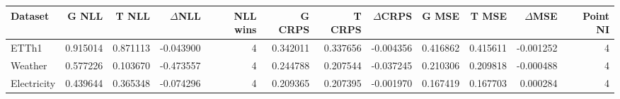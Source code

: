 \begin{tabular}{@{}lrrrrrrrrrrr@{}}
\toprule
Dataset & G NLL & T NLL & $\Delta$NLL & NLL wins & G CRPS & T CRPS & $\Delta$CRPS & G MSE & T MSE & $\Delta$MSE & Point NI \\
\midrule
ETTh1 & 0.915014 & 0.871113 & -0.043900 & 4 & 0.342011 & 0.337656 & -0.004356 & 0.416862 & 0.415611 & -0.001252 & 4 \\
Weather & 0.577226 & 0.103670 & -0.473557 & 4 & 0.244788 & 0.207544 & -0.037245 & 0.210306 & 0.209818 & -0.000488 & 4 \\
Electricity & 0.439644 & 0.365348 & -0.074296 & 4 & 0.209365 & 0.207395 & -0.001970 & 0.167419 & 0.167703 & 0.000284 & 4 \\
\bottomrule
\end{tabular}

